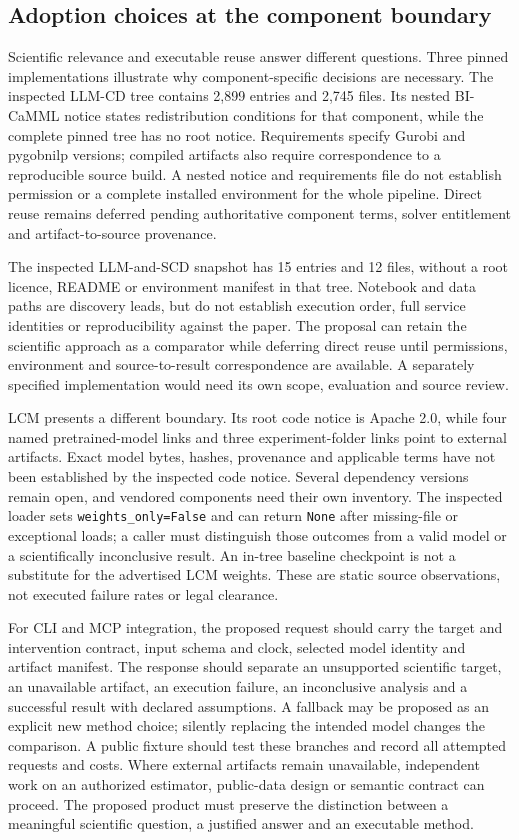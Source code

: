 \subsection{Adoption choices at the component boundary}

Scientific relevance and executable reuse answer different questions. Three pinned implementations illustrate why component-specific decisions are necessary. The inspected LLM-CD tree contains 2,899 entries and 2,745 files. Its nested BI-CaMML notice states redistribution conditions for that component, while the complete pinned tree has no root notice. Requirements specify Gurobi and pygobnilp versions; compiled artifacts also require correspondence to a reproducible source build. A nested notice and requirements file do not establish permission or a complete installed environment for the whole pipeline. Direct reuse remains deferred pending authoritative component terms, solver entitlement and artifact-to-source provenance.\citep{exec28_lm_artifacts}

The inspected LLM-and-SCD snapshot has 15 entries and 12 files, without a root licence, README or environment manifest in that tree. Notebook and data paths are discovery leads, but do not establish execution order, full service identities or reproducibility against the paper. The proposal can retain the scientific approach as a comparator while deferring direct reuse until permissions, environment and source-to-result correspondence are available. A separately specified implementation would need its own scope, evaluation and source review.\citep{exec28_lm_artifacts}

LCM presents a different boundary. Its root code notice is Apache 2.0, while four named pretrained-model links and three experiment-folder links point to external artifacts. Exact model bytes, hashes, provenance and applicable terms have not been established by the inspected code notice. Several dependency versions remain open, and vendored components need their own inventory. The inspected loader sets \texttt{weights\_only=False} and can return \texttt{None} after missing-file or exceptional loads; a caller must distinguish those outcomes from a valid model or a scientifically inconclusive result. An in-tree baseline checkpoint is not a substitute for the advertised LCM weights. These are static source observations, not executed failure rates or legal clearance.\citep{exec28_lm_artifacts}

For CLI and MCP integration, the proposed request should carry the target and intervention contract, input schema and clock, selected model identity and artifact manifest. The response should separate an unsupported scientific target, an unavailable artifact, an execution failure, an inconclusive analysis and a successful result with declared assumptions. A fallback may be proposed as an explicit new method choice; silently replacing the intended model changes the comparison. A public fixture should test these branches and record all attempted requests and costs. Where external artifacts remain unavailable, independent work on an authorized estimator, public-data design or semantic contract can proceed. The proposed product must preserve the distinction between a meaningful scientific question, a justified answer and an executable method.
